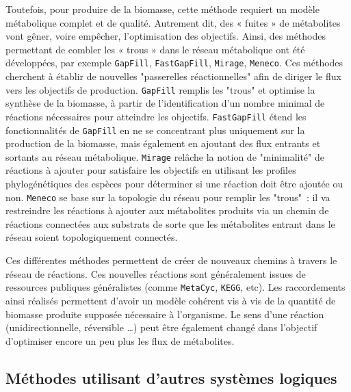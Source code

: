\begin{refsegment}
    Toutefois, pour produire de la biomasse, cette méthode requiert un modèle métabolique complet et de qualité. Autrement dit, des « fuites » de métabolites vont gêner, voire empêcher, l’optimisation des objectifs. Ainsi, des méthodes permettant de combler les « trous » dans le réseau métabolique ont été développées, par exemple \texttt{GapFill}\cite{kumar2007optimization}, \texttt{FastGapFill}\cite{thiele2014fastgapfill}, \texttt{Mirage}\cite{vitkin2012mirage}, \texttt{Meneco}\cite{prigent2017meneco}. Ces méthodes cherchent à établir de nouvelles "passerelles réactionnelles" afin de diriger le flux vers les objectifs de production. \texttt{GapFill} remplis les "trous" et optimise la synthèse de la biomasse, à partir de l’identification d’un nombre minimal de réactions nécessaires pour atteindre les objectifs. \texttt{FastGapFill} étend les fonctionnalités de \texttt{GapFill} en ne se concentrant plus uniquement sur la production de la biomasse, mais également en ajoutant des flux entrants et sortants au réseau métabolique. \texttt{Mirage} relâche la notion de "minimalité" de réactions à ajouter pour satisfaire les objectifs en utilisant les profiles phylogénétiques des espèces pour déterminer si une réaction doit être ajoutée ou non. \texttt{Meneco} se base sur la topologie du réseau pour remplir les "trous" : il va restreindre les réactions à ajouter aux métabolites produits via un chemin de réactions connectées aux substrats de sorte que les métabolites entrant dans le réseau soient topologiquement connectés.
    
    Ces différentes méthodes permettent de créer de nouveaux chemins à travers le réseau de réactions. Ces nouvelles réactions sont généralement issues de ressources publiques généralistes (comme \texttt{MetaCyc}, \texttt{KEGG}, etc). Les raccordements ainsi réalisés permettent d’avoir un modèle cohérent vis à vis de la quantité de biomasse produite supposée nécessaire à l’organisme. Le sens d’une réaction (unidirectionnelle, réversible \ldots) peut être également changé dans l’objectif d’optimiser encore un peu plus les flux de métabolites.
    
    \subsection{Méthodes utilisant d'autres systèmes logiques }
    

\end{refsegment}
